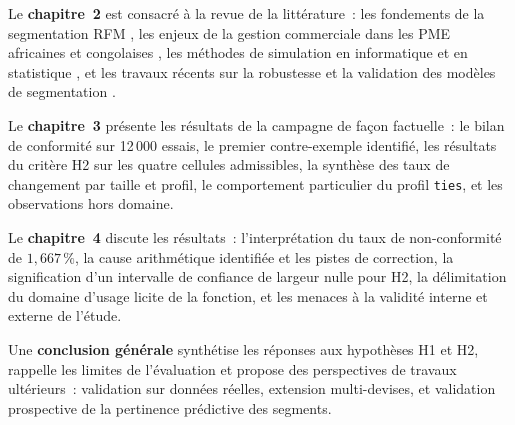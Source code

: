\medskip

Le \textbf{chapitre~2} est consacré à la revue de la littérature~: les fondements de la
segmentation RFM \citep{Fader2005, Salminen2023}, les enjeux de la gestion commerciale
dans les PME africaines et congolaises \citep{Sobantu2025, Yoseph2023}, les méthodes de
simulation en informatique et en statistique \citep{Morris2019}, et les travaux récents sur
la robustesse et la validation des modèles de segmentation \citep{Rajendran2024,
Mingmongkhol2023, Ray2023}.

\medskip

Le \textbf{chapitre~3} présente les résultats de la campagne de façon factuelle~: le bilan
de conformité sur 12\,000 essais, le premier contre-exemple identifié, les résultats du
critère H2 sur les quatre cellules admissibles, la synthèse des taux de changement par taille
et profil, le comportement particulier du profil \texttt{ties}, et les observations
hors domaine.

\medskip

Le \textbf{chapitre~4} discute les résultats~: l'interprétation du taux de non-conformité de
$1{,}667\,\%$, la cause arithmétique identifiée et les pistes de correction, la signification
d'un intervalle de confiance de largeur nulle pour H2, la délimitation du domaine d'usage
licite de la fonction, et les menaces à la validité interne et externe de l'étude.

\medskip

Une \textbf{conclusion générale} synthétise les réponses aux hypothèses H1 et H2, rappelle
les limites de l'évaluation et propose des perspectives de travaux ultérieurs~: validation
sur données réelles, extension multi-devises, et validation prospective de la pertinence
prédictive des segments.
